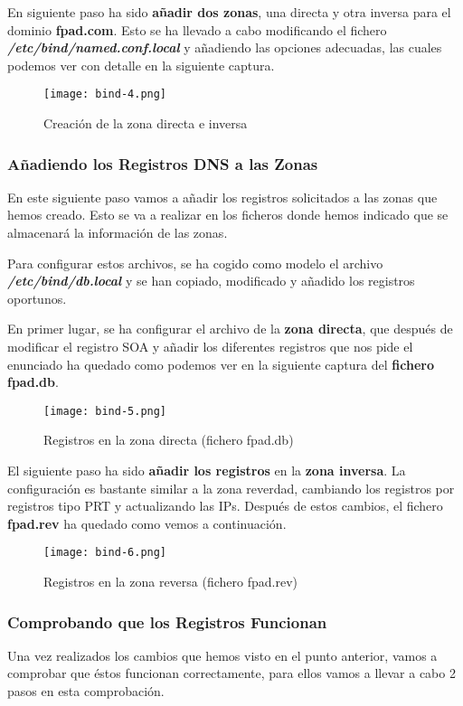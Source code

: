 En siguiente paso ha sido \textbf{añadir dos zonas}, una directa y otra inversa para el dominio \textbf{fpad.com}. Esto se ha llevado a cabo modificando el fichero \textbf{\textit{/etc/bind/named.conf.local}} y añadiendo las opciones adecuadas, las cuales podemos ver con detalle en la siguiente captura.

\begin{figure}[H]
    \centering
    \texttt{[image: bind-4.png]}
    \caption{Creación de la zona directa e inversa}
\end{figure}

\subsubsection{Añadiendo los Registros DNS a las Zonas}
En este siguiente paso vamos a añadir los registros solicitados a las zonas que hemos creado. Esto se va a realizar en los ficheros donde hemos indicado que se almacenará la información de las zonas.

Para configurar estos archivos, se ha cogido como modelo el archivo \textbf{\textit{/etc/bind/db.local}} y se han copiado, modificado y añadido los registros oportunos.

En primer lugar, se ha configurar el archivo de la \textbf{zona directa}, que después de modificar el registro SOA y añadir los diferentes registros que nos pide el enunciado ha quedado como podemos ver en la siguiente captura del \textbf{fichero fpad.db}.

\begin{figure}[H]
    \centering
    \texttt{[image: bind-5.png]}
    \caption{Registros en la zona directa (fichero fpad.db)}
\end{figure}

El siguiente paso ha sido \textbf{añadir los registros} en la \textbf{zona inversa}. La configuración es bastante similar a la zona reverdad, cambiando los registros por registros tipo PRT y actualizando las IPs. Después de estos cambios, el fichero \textbf{fpad.rev} ha quedado como vemos a continuación.

\begin{figure}[H]
    \centering
    \texttt{[image: bind-6.png]}
    \caption{Registros en la zona reversa (fichero fpad.rev)}
\end{figure}

\subsubsection{Comprobando que los Registros Funcionan}
Una vez realizados los cambios que hemos visto en el punto anterior, vamos a comprobar que éstos funcionan correctamente, para ellos vamos a llevar a cabo 2 pasos en esta comprobación.

